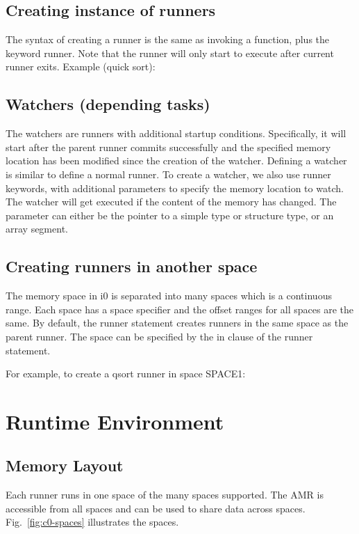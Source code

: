 \documentclass[a4paper]{article}
\begin{document}
\subsection{Creating instance of runners}

The syntax of creating a runner is the same as invoking a function, plus the keyword runner. Note that the runner will only start to execute after current runner exits.
Example (quick sort):



\subsection{Watchers (depending tasks)}

The watchers are runners with additional startup conditions. Specifically, it will start after the parent runner commits successfully and the specified memory location has been modified since the creation of the watcher.
Defining a watcher is similar to define a normal runner.
To create a watcher, we also use runner keywords, with additional parameters to specify the memory location to watch. The watcher will get executed if the content of the memory has changed. The parameter can either be the pointer to a simple type or structure type, or an array segment.



\subsection{Creating runners in another space}

The memory space in i0 is separated into many spaces which is a continuous range. Each space has a space specifier and the offset ranges for all spaces are the same. By default, the runner statement creates runners in the same space as the parent runner. The space can be specified by the in clause of the runner statement.

For example, to create a qsort runner in space SPACE1:



\section{Runtime Environment}

\subsection{Memory Layout}
Each runner runs in one space of the many spaces supported. The AMR is accessible from all spaces and can be used to share data across spaces. Fig.~\ref{fig:c0-spaces} illustrates the spaces.
\end{document}
